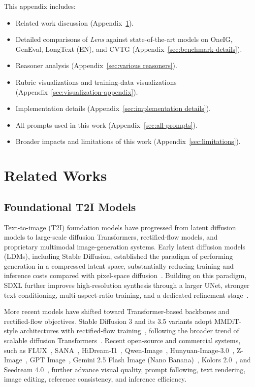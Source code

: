 \newpage
\appendix

This appendix includes: 
\begin{itemize}
    \item Related work discussion (Appendix~\ref{sec:related works}).
    \item Detailed comparisons of \textit{Lens} against state-of-the-art models on OneIG, GenEval, LongText (EN), and CVTG (Appendix~\ref{sec:benchmark-details}).
    \item Reasoner analysis (Appendix~\ref{sec:various reasoners}).
    \item Rubric visualizations and training-data visualizations (Appendix~\ref{sec:visualization-appendix}).
    \item Implementation details (Appendix~\ref{sec:implementation details}).
    \item All prompts used in this work (Appendix~\ref{sec:all-prompts}).
    \item Broader impacts and limitations of this work (Appendix~\ref{sec:limitations}).
\end{itemize}


\section{Related Works}
\label{sec:related works}

\subsection{Foundational T2I Models}
Text-to-image (T2I) foundation models have progressed from latent diffusion models to large-scale diffusion Transformers, rectified-flow models, and proprietary multimodal image-generation systems. Early latent diffusion models (LDMs), including Stable Diffusion, established the paradigm of performing generation in a compressed latent space, substantially reducing training and inference costs compared with pixel-space diffusion~\citep{rombach2022high}. Building on this paradigm, SDXL further improves high-resolution synthesis through a larger UNet, stronger text conditioning, multi-aspect-ratio training, and a dedicated refinement stage~\citep{podell2024sdxl}.

More recent models have shifted toward Transformer-based backbones and rectified-flow objectives. Stable Diffusion 3 and its 3.5 variants adopt MMDiT-style architectures with rectified-flow training~\citep{esser2024scaling,stabilityai2024sd35}, following the broader trend of scalable diffusion Transformers~\citep{peebles2023scalable}. Recent open-source and commercial systems, such as FLUX~\citep{flux2024}, SANA~\citep{xie2024sana}, HiDream-I1~\citep{cai2025hidream}, Qwen-Image~\citep{wu2025qwenimage}, Hunyuan-Image-3.0~\citep{cao2025hunyuanimage}, Z-Image~\citep{cai2025zimage}, GPT Image~\citep{openai2025gptimage}, Gemini 2.5 Flash Image (Nano Banana)~\citep{google2025nanobanana}, Kolors 2.0~\citep{kolors2}, and Seedream 4.0~\citep{seedream2025seedream4}, further advance visual quality, prompt following, text rendering, image editing, reference consistency, and inference efficiency.

